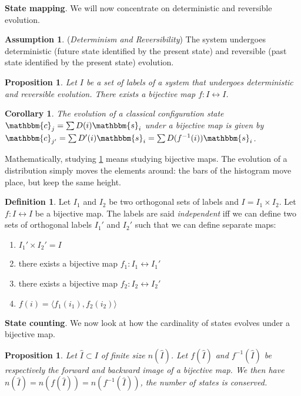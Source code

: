 \documentclass[twocolumn,floatfix,nofootinbib]{revtex4}   %
\theoremstyle{theorem}
\newtheorem{cor}[thm]{Corollary}
\newtheorem{prop}[thm]{Proposition}
\theoremstyle{definition}
\newtheorem{defn}[thm]{Definition}
\newtheorem{assump}[thm]{Assumption}
\begin{document}
\textbf{State mapping}. We will now concentrate on deterministic and reversible evolution.
\begin{assump}\label{detAss}
(\emph{Determinism and Reversibility}) The system undergoes deterministic (future state identified by the present state) and reversible (past state identified by the present state) evolution.
\end{assump}

\begin{prop}\label{detMap}
Let $I$ be a set of labels of a system that undergoes deterministic and reversible evolution. There exists a bijective map $f:I \leftrightarrow I$.
\end{prop}

\begin{cor}\label{discreteEv}
The evolution of a classical configuration state $\mathbbm{c}_j=\sum D(i) \mathbbm{s}_i$ under a bijective map is given by $\mathbbm{c}_{j'}=\sum D'(i) \mathbbm{s}_{i}=\sum D(f^{-1}(i)) \mathbbm{s}_{i}$.
\end{cor}

Mathematically, studying \ref{detAss} means studying bijective maps. The evolution of a distribution simply moves the elements around: the bars of the histogram move place, but keep the same height.

\begin{defn}\label{labelsIndep}
Let $I_1$ and $I_2$ be two orthogonal sets of labels and $I = I_1 \times I_2$. Let $f:I \leftrightarrow I$ be a bijective map. The labels are said \emph{independent} iff we can define two sets of orthogonal labels $I_1'$ and $I_2'$ such that we can define separate maps:
\begin{enumerate}
\item $I_1' \times I_2' = I$
\item there exists a bijective map $f_1: I_1 \leftrightarrow I_1'$
\item there exists a bijective map $f_2: I_2 \leftrightarrow I_2'$
\item $f(i) = \langle f_1(i_1), f_2(i_2)\rangle$
\end{enumerate}
\end{defn}

\textbf{State counting}. We now look at how the cardinality of states evolves under a bijective map.

\begin{prop}\label{labelsCount}
Let $\hat{I} \subset I$ of finite size $n(\hat{I})$. Let $f(\hat{I})$ and $f^{-1}(\hat{I})$ be respectively the forward and backward image of a bijective map. We then have $n(\hat{I})=n(f(\hat{I}))=n(f^{-1}(\hat{I}))$, the number of states is conserved.
\end{prop}
\end{document}
